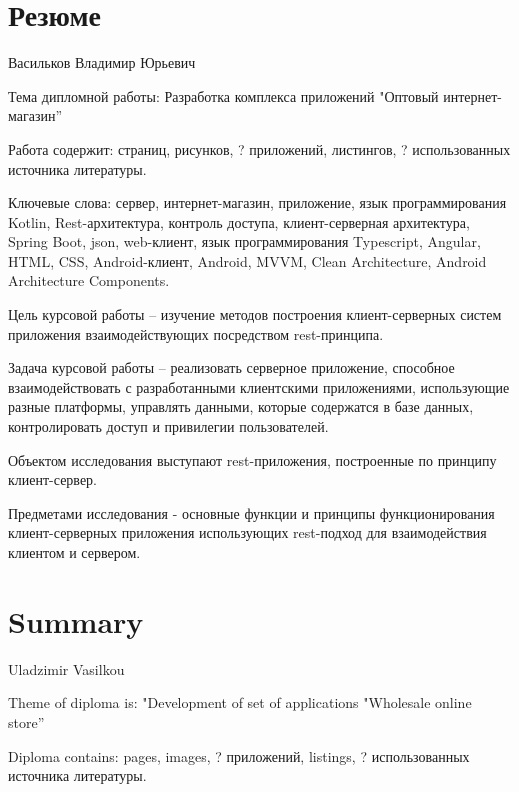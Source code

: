 \section*{Резюме}\label{sec:cw-ru}%

\indent \par Васильков Владимир Юрьевич

\vspace{1em}

Тема дипломной работы: Разработка комплекса приложений "Оптовый интернет-магазин”

Работа содержит: \pageref{LastPage} страниц,  рисунков, ? приложений,  листингов, ? использованных источника литературы.

Ключевые слова: сервер, интернет-магазин, приложение, язык программирования Kotlin, Rest-архитектура, контроль доступа, клиент-серверная архитектура, Spring Boot, json, web-клиент, язык программирования Typescript, Angular, HTML, CSS, Android-клиент, Android, MVVM, Clean Architecture, Android Architecture Components.

Цель курсовой работы – изучение методов построения клиент-серверных систем приложения взаимодействующих посредством rest-принципа.

Задача курсовой работы – реализовать серверное приложение, способное взаимодействовать с разработанными клиентскими приложениями, использующие разные платформы, управлять данными, которые содержатся в базе данных, контролировать доступ и привилегии пользователей.

Объектом исследования выступают rest-приложения, построенные по принципу клиент-сервер.

Предметами исследования - основные функции и принципы функционирования клиент-серверных приложения использующих rest-подход для взаимодействия клиентом и сервером.

\section*{Summary}\label{sec:cw-eng}\indent
{}
Uladzimir Vasilkou

\vspace{1em}
Theme of diploma is: "Development of set of applications "Wholesale online store”

Diploma contains: \pageref{LastPage} pages,  images, ? приложений,  listings, ? использованных источника литературы.

